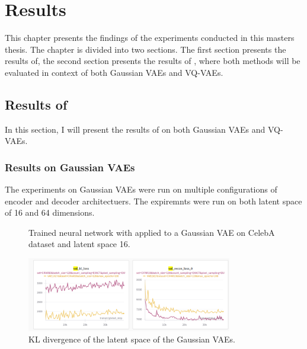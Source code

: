 \chapter{Results}

This chapter presents the findings of the experiments conducted in this masters thesis. The chapter is divided into two sections.
The first section presents the results of, the second section presents the results of ,
 where both methods will be evaluated in context of both Gaussian VAEs and VQ-VAEs.

\section{Results of }

In this section, I will present the results of  on both Gaussian VAEs and VQ-VAEs.

\subsection{Results on Gaussian VAEs}
The experiments on Gaussian VAEs were run on multiple configurations of encoder and decoder architectuers. 
The expiremnts were run on both latent space of 16 and 64 dimensions. 


\begin{figure}[H]
    \centering
    
    \caption[Trained neural network with  applied to a Gaussian VAE.]
    { Trained neural network with  applied to a Gaussian VAE on CelebA dataset and latent space 16.
    }
    \label{fig:res_val}
\end{figure}

\begin{figure}[H]
    \centering
    \includegraphics[width=0.8\textwidth]{figures/SCVAE2D_16_CIFAR10.png}
    \caption{KL divergence of the latent space of the Gaussian VAEs.}
    \label{fig:kl_divergence_gaussian_vae}
\end{figure}

